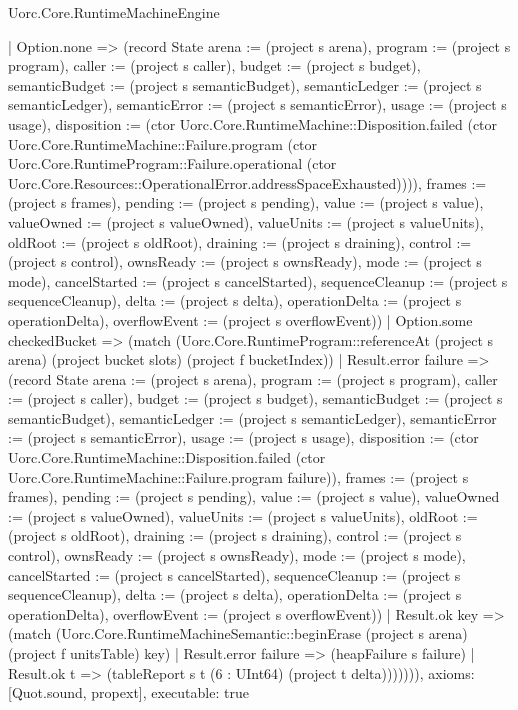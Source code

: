 \begin{lexlean}{Uorc.Core.RuntimeMachineEngine}
\begin{semanticmodule}
{        | Option.none => (record State {arena := (project s arena), program := (project s program), caller := (project s caller), budget := (project s budget), semanticBudget := (project s semanticBudget), semanticLedger := (project s semanticLedger), semanticError := (project s semanticError), usage := (project s usage), disposition := (ctor Uorc.Core.RuntimeMachine::Disposition.failed (ctor Uorc.Core.RuntimeMachine::Failure.program (ctor Uorc.Core.RuntimeProgram::Failure.operational (ctor Uorc.Core.Resources::OperationalError.addressSpaceExhausted)))), frames := (project s frames), pending := (project s pending), value := (project s value), valueOwned := (project s valueOwned), valueUnits := (project s valueUnits), oldRoot := (project s oldRoot), draining := (project s draining), control := (project s control), ownsReady := (project s ownsReady), mode := (project s mode), cancelStarted := (project s cancelStarted), sequenceCleanup := (project s sequenceCleanup), delta := (project s delta), operationDelta := (project s operationDelta), overflowEvent := (project s overflowEvent)})
        | Option.some checkedBucket => (match (Uorc.Core.RuntimeProgram::referenceAt (project s arena) (project bucket slots) (project f bucketIndex))
          | Result.error failure => (record State {arena := (project s arena), program := (project s program), caller := (project s caller), budget := (project s budget), semanticBudget := (project s semanticBudget), semanticLedger := (project s semanticLedger), semanticError := (project s semanticError), usage := (project s usage), disposition := (ctor Uorc.Core.RuntimeMachine::Disposition.failed (ctor Uorc.Core.RuntimeMachine::Failure.program failure)), frames := (project s frames), pending := (project s pending), value := (project s value), valueOwned := (project s valueOwned), valueUnits := (project s valueUnits), oldRoot := (project s oldRoot), draining := (project s draining), control := (project s control), ownsReady := (project s ownsReady), mode := (project s mode), cancelStarted := (project s cancelStarted), sequenceCleanup := (project s sequenceCleanup), delta := (project s delta), operationDelta := (project s operationDelta), overflowEvent := (project s overflowEvent)})
          | Result.ok key => (match (Uorc.Core.RuntimeMachineSemantic::beginErase (project s arena) (project f unitsTable) key)
            | Result.error failure => (heapFailure s failure)
            | Result.ok t => (tableReport s t (6 : UInt64) (project t delta))))))),
  axioms: [Quot.sound, propext],
  executable: true
}


\end{semanticmodule}
\end{lexlean}
